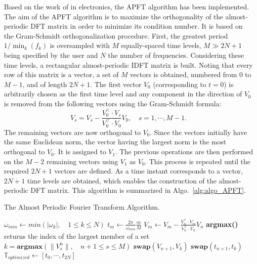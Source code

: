 Based on the work of \citet{Kundert1988} in
electronics, the APFT algorithm has been implemented.  The aim of the
APFT algorithm is to maximize the orthogonality of the almost-periodic
DFT matrix in order to minimize its condition number.  It is based on
the Gram-Schmidt orthogonalization procedure.  First, the greatest
period $1/\min_k(f_k)$ is oversampled with $M$ equally-spaced time
levels, $M\gg2N+1$ being specified by the user and $N$ the number of
frequencies. Considering these time levels, a rectangular
almost-periodic IDFT matrix is built. Noting that every row of this
matrix is a vector, a set of $M$ vectors is obtained, numbered from 0
to $M-1$, and of length $2N+1$. The first vector $V_0$ (corresponding
to $t=0$) is arbitrarily chosen as the first time level and any
component in the direction of $V_0$ is removed from the following
vectors using the Gram-Schmidt formula:
\begin{equation}
   V_s = V_s - \frac{V_0^\top \cdot V_s}{V_0^\top \cdot V_0} V_0, \quad s=1,\cdots,M-1.
   \label{GramSchmidtAlgo}
\end{equation}
The remaining vectors are now orthogonal to $V_0$.  Since the vectors 
initially have the same Euclidean norm, the vector having the largest
norm is the most orthogonal to $V_0$.  It is assigned to $V_1$. The previous
operations are then performed on the $M-2$ remaining vectors using $V_1$
as $V_0$. This process is repeated until the required $2N+1$ vectors
are defined. As a time instant corresponds to a vector, $2N+1$ time levels are obtained, 
which enables the construction of the almost-periodic
DFT matrix. This algorithm is summarized in
Algo.~\ref{alg:algo_APFT}.

\begin{algorithm}[htb]
\caption{The Almost Periodic Fourier Transform Algorithm.}
\label{alg:algo_APFT}
\begin{algorithmic}
\STATE $\omega_{min} \leftarrow min \left( |\omega_k |,\quad 1 \leqslant k \leqslant N \right)$
    \STATE $t_m \leftarrow \displaystyle\frac{2\pi}{\omega_{min}}\frac{m}{M}$
\ENDFOR
{}
  \STATE $ V_{m} \leftarrow V_{m} - \displaystyle\frac{V_{n}^\top \cdot V_{m}}{V_{n}^\top \cdot V_{n}} V_{n}$
   \ENDFOR
   \STATE \textbf{argmax()} returns the index of the largest member of a set
   \STATE $k=\textbf{argmax} \left( \| V_s^n \|,\quad n+1\leqslant s \leqslant M\right) $
   \STATE $\textbf{swap}(V_{n+1},V_{k})$
   \STATE $\textbf{swap}(t_{n+1},t_{k})$
\ENDFOR
\STATE $\mathbb{T}_{optimized} \leftarrow [t_0, \cdots, t_{2N}]$
\end{algorithmic}
\end{algorithm}

